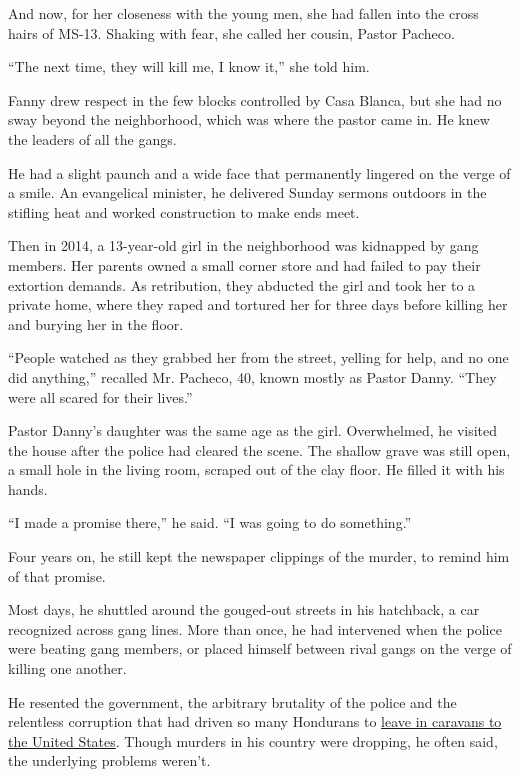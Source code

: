And now, for her closeness with the young men, she had fallen into the
cross hairs of MS-13. Shaking with fear, she called her cousin, Pastor
Pacheco.

``The next time, they will kill me, I know it,'' she told him.

Fanny drew respect in the few blocks controlled by Casa Blanca, but she
had no sway beyond the neighborhood, which was where the pastor came in.
He knew the leaders of all the gangs.

He had a slight paunch and a wide face that permanently lingered on the
verge of a smile. An evangelical minister, he delivered Sunday sermons
outdoors in the stifling heat and worked construction to make ends meet.

Then in 2014, a 13-year-old girl in the neighborhood was kidnapped by
gang members. Her parents owned a small corner store and had failed to
pay their extortion demands. As retribution, they abducted the girl and
took her to a private home, where they raped and tortured her for three
days before killing her and burying her in the floor.

``People watched as they grabbed her from the street, yelling for help,
and no one did anything,'' recalled Mr. Pacheco, 40, known mostly as
Pastor Danny. ``They were all scared for their lives.''

Pastor Danny's daughter was the same age as the girl. Overwhelmed, he
visited the house after the police had cleared the scene. The shallow
grave was still open, a small hole in the living room, scraped out of
the clay floor. He filled it with his hands.

``I made a promise there,'' he said. ``I was going to do something.''

Four years on, he still kept the newspaper clippings of the murder, to
remind him of that promise.

Most days, he shuttled around the gouged-out streets in his hatchback, a
car recognized across gang lines. More than once, he had intervened when
the police were beating gang members, or placed himself between rival
gangs on the verge of killing one another.

He resented the government, the arbitrary brutality of the police and
the relentless corruption that had driven so many Hondurans to
\href{https://www.nytimes.com/2018/10/24/world/americas/migrant-caravan-trump.html}{leave
in caravans to the United States}. Though murders in his country were
dropping, he often said, the underlying problems weren't.

